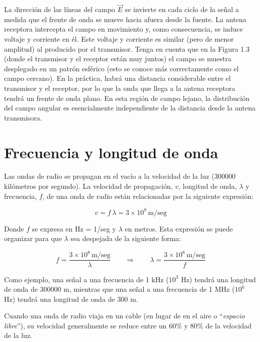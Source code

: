 La dirección de las líneas del campo $\vec{E}$ se invierte en cada ciclo de la señal a medida que el frente de onda se mueve hacia afuera desde la fuente. La antena receptora intercepta el campo en movimiento y, como consecuencia, se induce voltaje y corriente en él. Este voltaje y corriente es similar (pero de menor amplitud) al producido por el transmisor. Tenga en cuenta que en la Figura 1.3 (donde el transmisor y el receptor están muy juntos) el campo se muestra desplegado en un patrón esférico (esto se conoce más correctamente como el campo cercano). En la práctica, habrá una distancia considerable entre el transmisor y el receptor, por lo que la onda que llega a la antena receptora tendrá un frente de onda plano. En esta región de campo lejano, la distribución del campo angular es esencialmente independiente de la distancia desde la antena transmisora.


\section{Frecuencia y longitud de onda}
\label{sec:A.04.frecuencia.y.longitud.onda}


Las ondas de radio se propagan en el vac\'io a la velocidad de la luz (300000 kil\'ometros por segundo). La velocidad de propagación, $v$, longitud de onda, $\lambda$ y frecuencia, $f$, de una onda de radio están relacionadas por la siguiente expresi\'on:

\begin{equation}
  \label{eq:A.velocidad.onda}
  v = f\,\lambda = 3\times10^8\,\text{m}/\text{seg}
\end{equation}

Donde $f$ se expresa en Hz = 1/seg y $\lambda$ en metros. 
Esta expresi\'on se puede organizar para que $\lambda$ sea despejada de la siguiente forma:

\begin{equation}
  \label{eq:A.frecuencia.ecuacion}
  f = \displaystyle \frac{3\times10^8\,\text{m}/\text{seg}}{\lambda} \qquad \Longrightarrow \qquad
  \lambda = \displaystyle \frac{3\times10^8\,\text{m}/\text{seg}}{f}
\end{equation}

Como ejemplo, una señal a una frecuencia de 1 kHz ($10^3$ Hz) tendrá una longitud de onda de 300000 m, mientras que una señal a una frecuencia de 1 MHz ($10^6$ Hz) tendrá una longitud de onda de 300 m.

Cuando una onda de radio viaja en un cable (en lugar de en el aire o ``\emph{espacio libre}''), su velocidad generalmente se reduce entre un 60\% y 80\% de la velocidad de la luz.

